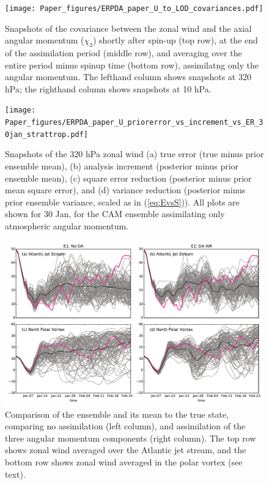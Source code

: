  \begin{figure}
	 \texttt{[image: Paper\_figures/ERPDA\_paper\_U\_to\_LOD\_covariances.pdf]}
	 \caption{Snapshots of the covariance between the zonal wind and the axial angular momentum ($\chi_3$) shortly after spin-up (top row), at the end of the assimilation period (middle row), and averaging over the entire period minus spinup time (bottom row), assimilatng only the angular momentum. The lefthand column shows snapshots at 320 hPa; the righthand column shows snapshots at 10 hPa.}
 \label{fig:covariances}
\end{figure}

 \begin{figure}
	 \texttt{[image: Paper\_figures/ERPDA\_paper\_U\_priorerror\_vs\_increment\_vs\_ER\_30jan\_strattrop.pdf]}
	 \caption{Snapshots of the 320 hPa zonal wind (a) true error (true minus prior ensemble mean), (b) analysis increment (posterior minus prior ensemble mean), (c) square error reduction (posterior minus prior mean square error), and (d) variance reduction (posterior minus prior ensemble variance, scaled as in (\ref{eq:EvsS})). All plots are shown for 30 Jan, for the CAM ensemble assimilating only atmospheric angular momentum. } 
 \label{fig:error_increments}
\end{figure}

 \begin{figure}
	 \includegraphics[width=\textwidth]{Paper_figures/ERPDA_paper_point_checks.pdf}
	 \caption{Comparison of the ensemble and its mean to the true state, comparing no assimilation (left column), and assimilation of the three angular momentum components (right column). The top row shows zonal wind averaged over the Atlantic jet stream, and the bottom row shows zonal wind averaged in the polar vortex (see text).}
	 \label{fig:point_checks}
\end{figure}


